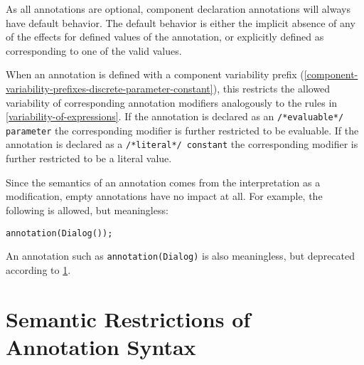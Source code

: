 As all annotations are optional, component declaration annotations will always have default behavior.
The default behavior is either the implicit absence of any of the effects for defined values of the annotation, or explicitly defined as corresponding to one of the valid values.

When an annotation is defined with a component variability prefix (\cref{component-variability-prefixes-discrete-parameter-constant}), this restricts the allowed variability of corresponding annotation modifiers analogously to the rules in \cref{variability-of-expressions}.
If the annotation is declared as an \lstinline!/*evaluable*/ parameter! the corresponding modifier is further restricted to be evaluable.
If the annotation is declared as a \lstinline!/*literal*/ constant! the corresponding modifier is further restricted to be a literal value.

\begin{example}
Since the semantics of an annotation comes from the interpretation as a modification, empty annotations have no impact at all.
For example, the following is allowed, but meaningless:
\begin{lstlisting}[language=modelica]
annotation(Dialog());
\end{lstlisting}
An annotation such as \lstinline!annotation(Dialog)! is also meaningless, but deprecated according to \cref{semantic-restrictions-of-annotation-syntax}.
\end{example}


\section{Semantic Restrictions of Annotation Syntax}\label{semantic-restrictions-of-annotation-syntax}

